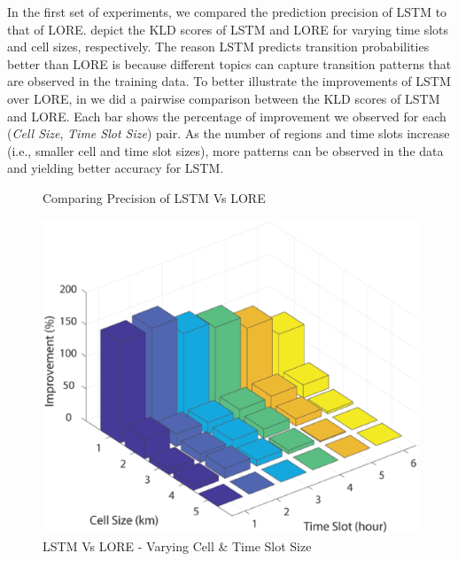 In the first set of experiments, we compared the prediction precision of LSTM to that of LORE.  depict the KLD scores of LSTM and LORE for varying time slots and cell sizes, respectively. The reason LSTM predicts transition probabilities better than LORE is because different topics can capture transition patterns that are observed in the training data. To better illustrate the improvements of LSTM over LORE, in  we did a pairwise comparison between the KLD scores of LSTM and LORE. Each bar shows the percentage of improvement we observed for each (\emph{Cell Size}, \emph{Time Slot Size}) pair. As the number of regions and time slots increase (i.e., smaller cell and time slot sizes), more patterns can be observed in the data and yielding better accuracy for LSTM.
\begin{figure}[!ht]
    \centering
    \caption{Comparing Precision of LSTM Vs LORE}
    \label{fig:defaults}
\end{figure}

\begin{figure}[!ht]
	\centering
	\includegraphics[width=0.75\columnwidth]{fig/klddiff}
	\caption{LSTM Vs LORE - Varying Cell \& Time Slot Size}\label{fig:klddiff}
%
%
\end{figure}

